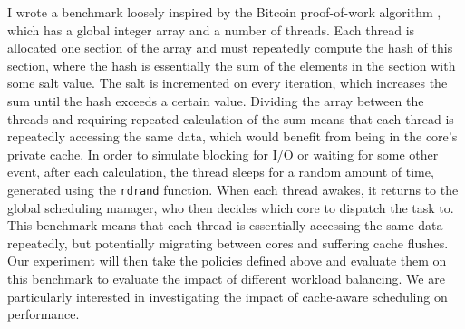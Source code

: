 \documentclass[bsc,frontabs,singlespacing,parskip,deptreport]{infthesis}
\begin{document}
I wrote a benchmark loosely inspired by the Bitcoin proof-of-work algorithm \cite{proof-of-work}, which has a global integer array and a number of threads. Each thread is allocated one section of the array and must repeatedly compute the hash of this section, where the hash is essentially the sum of the elements in the section with some salt value. The salt is incremented on every iteration, which increases the sum until the hash exceeds a certain value. Dividing the array between the threads and requiring repeated calculation of the sum means that each thread is repeatedly accessing the same data, which would benefit from being in the core's private cache. In order to simulate blocking for I/O or waiting for some other event, after each calculation, the thread sleeps for a random amount of time, generated using the \verb|rdrand| function. When each thread awakes, it returns to the global scheduling manager, who then decides which core to dispatch the task to. This benchmark means that each thread is essentially accessing the same data repeatedly, but potentially migrating between cores and suffering cache flushes. Our experiment will then take the policies defined above and evaluate them on this benchmark to evaluate the impact of different workload balancing. We are particularly interested in investigating the impact of cache-aware scheduling on performance.



\end{document}
